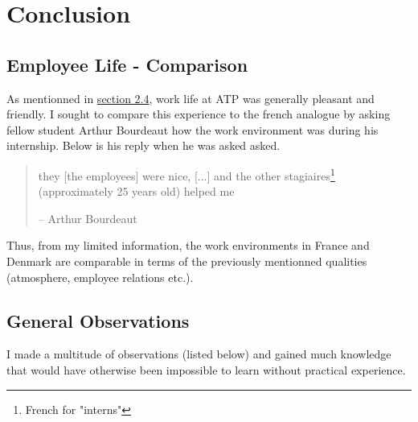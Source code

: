 \section{Conclusion}

\subsection{Employee Life - Comparison}

As mentionned in \hyperlink{subsection.2.4}{section 2.4}, work life at ATP was generally pleasant and friendly. I sought to compare this experience to the french analogue by asking fellow student Arthur Bourdeaut how the work environment was during his internship. Below is his reply when he was asked asked.

\begin{quote}
    \color{dgreen} they [the employees] were nice, [...] and the other stagiaires\footnote[0]{French for "interns"} (approximately 25 years old) helped me

    \color{black} -- Arthur Bourdeaut
\end{quote}

Thus, from my limited information, the work environments in France and Denmark are comparable in terms of the previously mentionned qualities (atmosphere, employee relations etc.).

\subsection{General Observations}

I made a multitude of observations (listed below) and gained much knowledge that would have otherwise been impossible to learn without practical experience.

